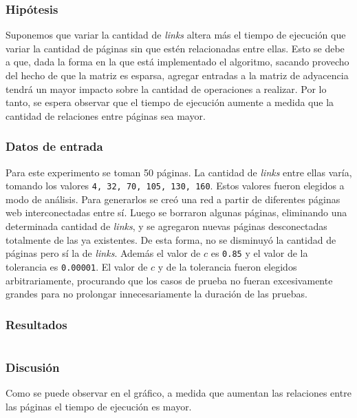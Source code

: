 			\subsubsection*{Hipótesis} 
			Suponemos que variar la cantidad de \emph{links} altera más el tiempo de ejecución que variar la cantidad de páginas sin que estén relacionadas entre ellas. Esto se debe a que, dada la forma en la que está implementado el algoritmo, sacando provecho del hecho de que la matriz es esparsa, agregar entradas a la matriz de adyacencia tendrá un mayor impacto sobre la cantidad de operaciones a realizar. Por lo tanto, se espera observar que el tiempo de ejecución aumente a medida que la cantidad de relaciones entre páginas sea mayor.

			\subsubsection*{Datos de entrada} 		
			Para este experimento se toman 50 páginas. La cantidad de \emph{links} entre ellas varía, tomando los valores \texttt{4, 32, 70, 105, 130, 160}. Estos valores fueron elegidos a modo de análisis. Para generarlos se creó una red a partir de diferentes páginas web interconectadas entre sí. Luego se borraron algunas páginas, eliminando una determinada cantidad de \emph{links}, y se agregaron nuevas páginas desconectadas totalmente de las ya existentes. De esta forma, no se disminuyó la cantidad de páginas pero sí la de \emph{links}. Además el valor de $c$ es \texttt{0.85} y el valor de la tolerancia es \texttt{0.00001}. El valor de $c$ y de la tolerancia fueron elegidos arbitrariamente, procurando que los casos de prueba no fueran excesivamente grandes para no prolongar innecesariamente la duración de las pruebas. 
			
			\subsubsection*{Resultados}
				{\centering \begin{tabular}{c}
			    \end{tabular}}


			\subsubsection*{Discusión}
			Como se puede observar en el gráfico, a medida que aumentan las relaciones entre las páginas el tiempo de ejecución es mayor.  

